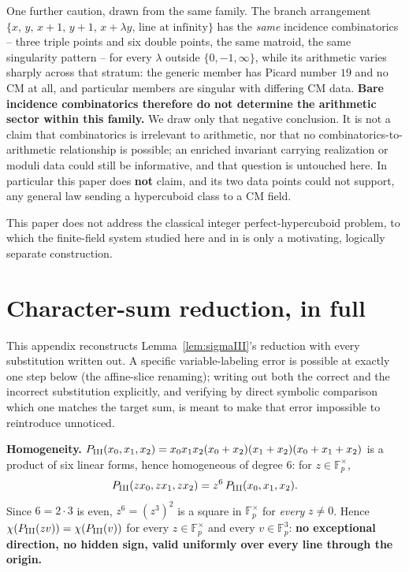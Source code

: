 \documentclass[11pt]{amsart}
\theoremstyle{definition}
\newcommand{\Fp}{\mathbb{F}_p}
\begin{document}
One further caution, drawn from the same family. The branch arrangement
$\{x,\,y,\,x+1,\,y+1,\,x+\lambda y,\,\text{line at infinity}\}$ has the
\emph{same} incidence combinatorics -- three triple points and six double
points, the same matroid, the same singularity pattern -- for every
$\lambda$ outside $\{0,-1,\infty\}$, while its arithmetic varies sharply
across that stratum: the generic member has Picard number $19$ and no CM
at all, and particular members are singular with differing CM data.
\textbf{Bare incidence combinatorics therefore do not determine the
arithmetic sector within this family.} We draw only that negative
conclusion. It is not a claim that combinatorics is irrelevant to
arithmetic, nor that no combinatorics-to-arithmetic relationship is
possible; an enriched invariant carrying realization or moduli data could
still be informative, and that question is untouched here. In particular
this paper does \textbf{not} claim, and its two data points could not
support, any general law sending a hypercuboid class to a CM field.

This paper does not address the classical integer perfect-hypercuboid
problem, to which the finite-field system studied here and in
\cite{ClassesI_II} is only a motivating, logically separate construction.

\appendix

\section{Character-sum reduction, in full}
\label{app:A}

This appendix reconstructs Lemma~\ref{lem:sigmaIII}'s reduction with
every substitution written out. A specific variable-labeling error is
possible at exactly one step below (the affine-slice renaming); writing
out both the correct and the incorrect substitution explicitly, and
verifying by direct symbolic comparison which one matches the target
sum, is meant to make that error impossible to reintroduce unnoticed.

\textbf{Homogeneity.} $P_{\rm III}(x_0,x_1,x_2)=x_0x_1x_2(x_0+x_2)(x_1+x_2)(x_0+x_1+x_2)$
is a product of six linear forms, hence homogeneous of degree $6$: for
$z\in\Fp^\times$,
\[
P_{\rm III}(zx_0,zx_1,zx_2) = z^6\,P_{\rm III}(x_0,x_1,x_2).
\]
Since $6=2\cdot3$ is even, $z^6=(z^3)^2$ is a square in $\Fp^\times$ for
\emph{every} $z\neq0$. Hence $\chi(P_{\rm III}(zv))=\chi(P_{\rm III}(v))$
for every $z\in\Fp^\times$ and every $v\in\Fp^3$: \textbf{no exceptional
direction, no hidden sign, valid uniformly over every line through the
origin.}
\end{document}
